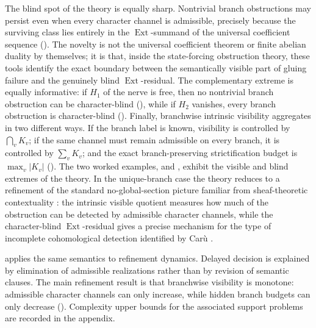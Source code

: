 The blind spot of the theory is equally sharp. Nontrivial branch obstructions may persist even when every character channel is admissible, precisely because the surviving class lies entirely in the $\operatorname{Ext}$-summand of the universal coefficient sequence (). The novelty is not the universal coefficient theorem or finite abelian duality by themselves; it is that, inside the state-forcing obstruction theory, these tools identify the exact boundary between the semantically visible part of gluing failure and the genuinely blind $\operatorname{Ext}$-residual. The complementary extreme is equally informative: if $H_1$ of the nerve is free, then no nontrivial branch obstruction can be character-blind (), while if $H_2$ vanishes, every branch obstruction is character-blind (). Finally, branchwise intrinsic visibility aggregates in two different ways. If the branch label is known, visibility is controlled by $\bigcap_v K_v$; if the same channel must remain admissible on every branch, it is controlled by $\sum_v K_v$; and the exact branch-preserving strictification budget is $\max_v |K_v|$ (). The two worked examples,  and , exhibit the visible and blind extremes of the theory. In the unique-branch case the theory reduces to a refinement of the standard no-global-section picture familiar from sheaf-theoretic contextuality \cite{AbramskyBrandenburger2011}: the intrinsic visible quotient measures how much of the obstruction can be detected by admissible character channels, while the character-blind $\operatorname{Ext}$-residual gives a precise mechanism for the type of incomplete cohomological detection identified by Car\`u \cite{Caru2017}.

 applies the same semantics to refinement dynamics. Delayed decision is explained by elimination of admissible realizations rather than by revision of semantic clauses. The main refinement result is that branchwise visibility is monotone: admissible character channels can only increase, while hidden branch budgets can only decrease (). Complexity upper bounds for the associated support problems are recorded in the appendix.
